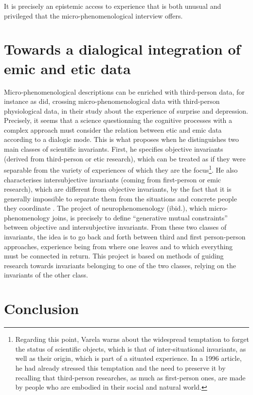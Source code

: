 \documentclass[output=paper]{langscibook}
\begin{document}
It is precisely an epistemic access to experience that is both unusual and privileged that the micro-phenomenological interview offers.


\section{Towards a dialogical integration of emic and etic data}

Micro-phenomenological descriptions can be enriched with third-person data, for instance as \citet{DeprazEtAl2017} did, crossing micro-phenomenological data with third-person physiological data, in their study about the experience of surprise and depression. Precisely, it seems that a science questionning the cognitive processes with a complex approach must consider the relation between etic and emic data according to a dialogic mode. This is what \citet{Varela2017} proposes when he distinguishes two main classes of scientific invariants. First, he specifies objective invariants (derived from third-person or etic research), which can be treated as if they were separable from the variety of experiences of which they are the focus\footnote{Regarding this point, Varela warns about the widespread temptation to forget the status of scientific objects, which is that of inter-situational invariants, as well as their origin, which is part of a situated experience. In a 1996 article, he had already stressed this temptation and the need to preserve it by recalling that third-person researches, as much as first-person ones, are made by people who are embodied in their social and natural world.}. He also characterises intersubjective invariants (coming from first-person or emic research), which are different from objective invariants, by the fact that it is generally impossible to separate them from the situations and concrete people they coordinate \citep{Varela2017}. The project of neurophenomenology (ibid.), which micro-phenomenology joins, is precisely to define “generative mutual constraints” between objective and intersubjective invariants. From these two classes of invariants, the idea is to go back and forth between third and first person-person approaches, experience being from where one leaves and to which everything must be connected in return. This project is based on methods of guiding research towards invariants belonging to one of the two classes, relying on the invariants of the other class. 

\section{Conclusion}\largerpage
\end{document}
